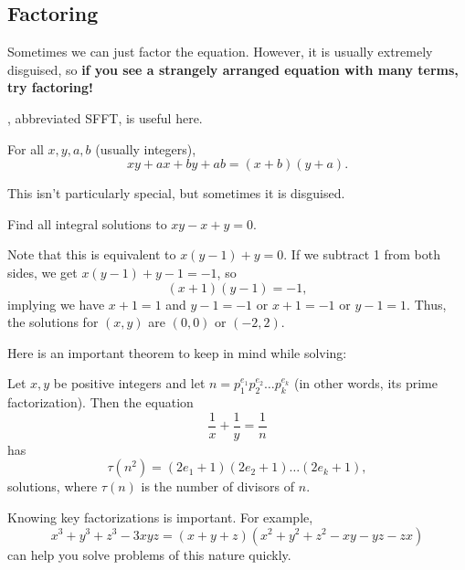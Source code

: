 \documentclass[mast]{lucky}
\begin{document}
\subsection{Factoring}
Sometimes we can just factor the equation. However, it is usually extremely disguised, so \textbf{if you see a strangely arranged equation with many terms, try factoring!}

, abbreviated SFFT, is useful here.
\begin{theo}[SFFT]
For all $x,y,a,b$ (usually integers),
$$xy+ax+by+ab=(x+b)(y+a).$$
\end{theo}
This isn't particularly special, but sometimes it is disguised.
\begin{exam}
Find all integral solutions to $xy-x+y=0$.
\end{exam}
\begin{sol}
Note that this is equivalent to $x(y-1)+y=0$. If we subtract 1 from both sides, we get $x(y-1)+y-1=-1$, so
$$(x+1)(y-1)=-1,$$
implying we have $x+1=1$ and $y-1=-1$ or $x+1=-1$ or $y-1=1$. Thus, the solutions for $(x,y)$ are $\boxed{(0,0)}$ or $\boxed{(-2,2)}$.
\end{sol}
Here is an important theorem to keep in mind while solving:
\begin{theo}
Let $x,y$ be positive integers and let $n=p_1^{e_1}p_2^{e_2}\ldots p_k^{e_k}$ (in other words, its prime factorization). Then the equation
$$\frac{1}{x}+\frac{1}{y}=\frac{1}{n}$$
has
$$\tau(n^2) = (2e_1+1)(2e_2+1)\ldots(2e_k+1),$$
solutions, where $\tau(n)$ is the number of divisors of $n$.
\end{theo}
Knowing key factorizations is important. For example,
$$x^3+y^3+z^3-3xyz=(x+y+z)(x^2+y^2+z^2-xy-yz-zx)$$
can help you solve problems of this nature quickly.
\end{document}
